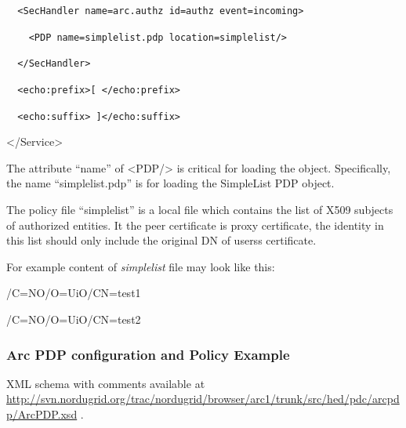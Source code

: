 \documentclass{article}
\begin{document}
{\upshape\color{black}
\foreignlanguage{spanish}{\texttt{\ \ }}\texttt{{\textless}SecHandler
name={\textquotedbl}arc.authz{\textquotedbl}
id={\textquotedbl}authz{\textquotedbl}
event={\textquotedbl}incoming{\textquotedbl}{\textgreater}}}

{\upshape\color{black}
\texttt{\ \ \ \ {\textless}PDP
name={\textquotedbl}}\texttt{simplelist}\texttt{.pdp{\textquotedbl}}\texttt{
location=}\texttt{{\textquotedbl}}\texttt{simplelist}\texttt{{\textquotedbl}}\texttt{/}\texttt{{\textgreater}}}

{\upshape\color{black}
\texttt{\ \ }\foreignlanguage{spanish}{\texttt{{\textless}/SecHandler{\textgreater}}}}

{\upshape\color{black}
\foreignlanguage{spanish}{\texttt{\ \ }}\foreignlanguage{spanish}{\texttt{{\textless}echo:prefix{\textgreater}[
{\textless}/echo:prefix{\textgreater}}}}

{\upshape\color{black}
\foreignlanguage{spanish}{\texttt{\ \ }}\texttt{{\textless}echo:suffix{\textgreater}
]{\textless}/echo:suffix{\textgreater}}}

{\ttfamily\color{black}
{\textless}/Service{\textgreater}}

{\color{black}
The attribute {\textquotedblleft}name{\textquotedblright} of
{\textless}PDP/{\textgreater} is critical for loading the object.
Specifically, the name
{\textquotedblleft}simplelist.pdp{\textquotedblright} is for loading
the SimpleList PDP object.}

{\upshape\color{black}
The policy file {\textquotedblleft}simplelist{\textquotedblright} is a
local file which contains the list of X509 subjects of authorized
entities. It the peer certificate is proxy certificate, the identity in
this list should only include the original DN of
users{\textquotesingle}s certificate.}

{\upshape\color{black}
For example content of \textit{simplelist} file may look like this:}

{\color{black}
/C=NO/O=UiO/CN=test1}

{\color{black}
/C=NO/O=UiO/CN=test2}

\subsubsection[Arc PDP configuration and Policy Example]{Arc PDP
configuration and Policy Example}
\label{bkm:Ref204009974}{\upshape\color{black}
XML schema with comments available at
\url{http://svn.nordugrid.org/trac/nordugrid/browser/arc1/trunk/src/hed/pdc/arcpdp/ArcPDP.xsd}
.}
\end{document}
